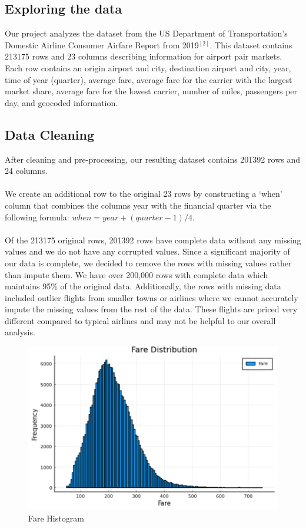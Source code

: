 \documentclass{article}
\begin{document}
\subsection{Exploring the data}

Our project analyzes the dataset from the US Department of Transportation’s Domestic Airline Consumer Airfare Report from 2019$^{[2]}$. This dataset contains 213175 rows and 23 columns describing information for airport pair markets. Each row contains an origin airport and city, destination airport and city, year, time of year (quarter), average fare, average fare for the carrier with the largest market share, average fare for the lowest carrier, number of miles, passengers per day, and geocoded information.

\subsection{Data Cleaning}
After cleaning and pre-processing, our resulting dataset contains 201392 rows and 24 columns.\\\\
We create an additional row to the original 23 rows by constructing a ‘when’ column that combines the columns year with the financial quarter via the following formula: $when = year + (quarter - 1)/4$. \\\\
Of the 213175 original rows, 201392 rows have complete data without any missing values and we do not have any corrupted values. Since a significant majority of our data is complete, we decided to remove the rows with missing values rather than impute them. We have over 200,000 rows with complete data which maintains 95\% of the original data. Additionally, the rows with missing data included outlier flights from smaller towns or airlines where we cannot accurately impute the missing values from the rest of the data. These flights are priced very different compared to typical airlines and may not be helpful to our overall analysis.

 \begin{figure}[h]
\centering
\includegraphics[scale=.5]{images/hist_plot.png}
\caption{Fare Histogram}
\end{figure}
\end{document}
